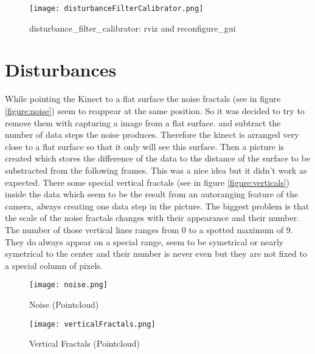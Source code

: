 \begin{figure}[htp]
\begin{center}
  \texttt{[image: disturbanceFilterCalibrator.png]}
  \caption{disturbance\_filter\_calibrator: rviz and reconfigure\_gui}
  \label{figure:distFilCal}
\end{center}
\end{figure}

\section{Disturbances}
While pointing the Kinect to a flat surface the noise fractals (see in figure \vref{figure:noise}) 
seem to reappear at the same position. So it was decided to try to remove them with capturing a image from a flat surface.
and subtract the number of data steps the noise produces. Therefore the kinect is arranged very close to a flat surface 
so that it only will see this surface. Then a picture is created which stores the difference of the data to the 
distance of the surface to be substracted from the following frames.
This was a nice idea but it didn't work as expected. There some special vertical fractals (see in figure \vref{figure:verticals}) 
inside the data which seem to be the result from an autoranging feature of the camera, 
always creating one data step in the picture. The biggest problem is that the scale of the noise fractals changes 
with their appearance and their number. The number of those vertical lines ranges from 0 to a spotted maximum of 9. 
They do always appear on a special range, seem to be symetrical or 
nearly symetrical to the center and their number is never even but they are not fixed to a special column of pixels. 
\begin{figure}[htp]
\begin{center}
  \texttt{[image: noise.png]}
  \caption{Noise (Pointcloud)}
  \label{figure:noise}
\end{center}
\end{figure}

\begin{figure}[htp]
\begin{center}
  \texttt{[image: verticalFractals.png]}
  \caption{Vertical Fractals (Pointcloud)}
  \label{figure:verticals}
\end{center}
\end{figure}

